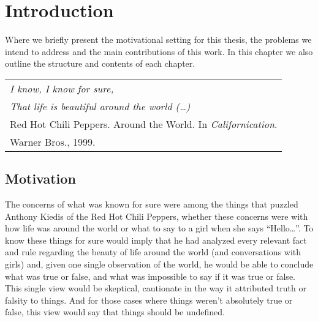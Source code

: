 \chapter{Introduction}
\label{cha:introduction}


\begin{ChapAbstract}
Where we briefly present the motivational setting for this thesis, the problems we intend to address and the main contributions of this work. In this chapter we also outline the structure and contents of each chapter.
\end{ChapAbstract}
	
\vspace*{0,5cm}
\begin{flushright}
	\begin{tabular}{l}
		\small \textsl{I know, I know for sure,}\\
  	\small \textsl{That life is beautiful around the world (\ldots)}\\
		\hline
		\scriptsize Red Hot Chili Peppers. Around the World. In \textsl{Californication}.\\
  	\scriptsize Warner Bros., 1999.
	\end{tabular}
	
\end{flushright}

\vspace*{1,5cm}

\section{Motivation}
\label{sec:motiv}
The concerns of what was known for sure were among the things that puzzled Anthony Kiedis of the Red Hot Chili Peppers, whether these concerns were with how life was around the world or what to say to a girl when she says ``Hello\ldots''\cite{californication}. To know these things for sure would imply that he had analyzed every relevant fact and rule regarding the beauty of life around the world (and conversations with girls) and, given one single observation of the world, he would be able to conclude what was true or false, and what was impossible to say if it was true or false. This single view would be skeptical, cautionate in the way it attributed truth or falsity to things. And for those cases where things weren't absolutely true or false, this view would say that things should be undefined.

